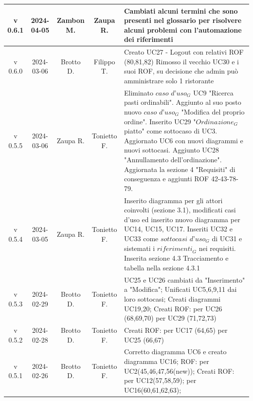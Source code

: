 \documentclass[12pt, oneside]{article}
\begin{document}
\begin{longtable}{|c|c|c|c|p{7cm}|}
\hline
v 0.6.1 & 2024-04-05 & Zambon M. & Zaupa R. & Cambiati alcuni termini che sono presenti nel glossario per risolvere alcuni problemi con l’automazione dei riferimenti\\
\hline
v 0.6.0 & 2024-03-06 & Brotto D. & Filippo T. & Creato UC27 - Logout con relativi ROF (80,81,82) 
\newline Rimosso il vecchio UC30 e i suoi ROF, su decisione che admin può amministrare solo 1 ristorante
\\
\hline
v 0.5.5 & 2024-03-06 & Zaupa R. & Tonietto F. & Eliminato $\textit{caso d'uso}_G$ UC9 "Ricerca pasti ordinabili". Aggiunto al suo posto nuovo $\textit{caso d'uso}_G$ "Modifica del proprio ordine". Inserito UC29 "$\textit{Ordinazione}_G$ piatto" come sottocaso di UC3. Aggiornato UC6 con nuovi diagrammi e nuovi sottocasi. Aggiunto UC28 "Annullamento dell'ordinazione". Aggiornata la sezione 4 "Requisiti" di conseguenza e aggiunti ROF 42-43-78-79. \\
\hline
v 0.5.4 & 2024-03-05 & Zaupa R. & Tonietto F. & Inserito diagramma per gli attori coinvolti (sezione 3.1), modificati casi d'uso ed inserito nuovo diagramma per UC14, UC15, UC17. Inseriti UC32 e UC33 come $\textit{sottocasi d'uso}_G$ di UC31 e sistemati i $\textit{riferimenti}_G$ nei requisiti. Inserita sezione 4.3 Tracciamento e tabella nella sezione 4.3.1\\
\hline
v 0.5.3 & 2024-02-29 & Brotto D. & Tonietto F. & UC25 e UC26 cambiati da "Inserimento" a "Modifica";
\newline Unificati UC5,6,9,11 dai loro sottocasi;
\newline Creati diagrammi UC19,20;
\newline Creati ROF:
\newline per UC26 (68,69,70)
\newline per UC29 (71,72,73)
\\
\hline
v 0.5.2 & 2024-02-28 & Brotto D. & Tonietto F. & Creati ROF:
\newline per UC17 (64,65) 
\newline per UC25 (66,67)
\\
\hline
v 0.5.1 & 2024-02-26 & Brotto D. & Tonietto F. & Corretto diagramma UC6 e creato diagramma UC16; \newline ROF: per UC2(45,46,47,56(new)); 
\newline Creati ROF: \newline per UC12(57,58,59); \newline per UC16(60,61,62,63); \\

\end{longtable}
\end{document}
